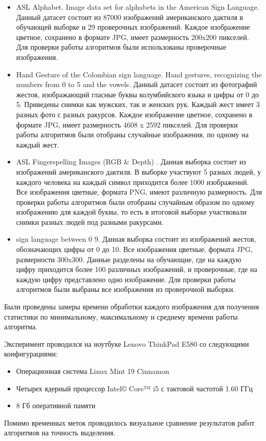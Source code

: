 \begin{itemize}
	\item ASL Alphabet. Image data set for alphabets in the American Sign Language\cite{AslAlphabet}. Данный датасет состоит из 87000 изображений американского дактиля в обучающей выборке и 29 проверочных изображений. Каждое изображение цветное, сохранено в формате JPG, имеет размерность 200x200 пикселей. Для проверки работы алгоритмов были использованы проверочные изображения.
	
	\item Hand Gesture of the Colombian sign language. Hand gestures, recognizing the numbers from 0 to 5 and the vowels\cite{Colombian}. Данный датасет состоит из фотографий жестов, изображающий гласные буквы колумбийского языка и цифры от 0 до 5. Приведены снимки как мужских, так и женских рук. Каждый жест имеет 3 разных фото с разных ракурсов. Каждое изображение цветное, сохранено в формате JPG, имеет размерность 4608 x 2592 пикселей. Для проверки работы алгоритмов были отобраны случайные изображения, по одному на каждый жест.
	
	\item ASL Fingerspelling Images (RGB \& Depth) \cite{asl2}. Данная выборка состоит из изображений американского дактиля. В выборке участвуют 5 разных людей, у каждого человека на каждый символ приходится более 1000 изображений. Все изображения цветные, формата PNG, имеют различную размерность. Для проверки работы алгоритмов были отобраны случайным образом по одному изображению для каждой буквы, то есть в итоговой выборке участвовали снимки разных людей под разными ракурсами.
	
	\item sign language between 0 9\cite{sl09}. Данная выборка состоит из изображений жестов, обозначающих цифры от 0 до 10. Все изображения цветные, формата JPG, размерности 300x300. Данные разделены на обучающие, где на каждую цифру приходится более 100 различных изображений, и проверочные, где на каждую цифру представлено одно изображение. Для проверки работы алгоритмов были выбраны все изображения из проверочной выборки. 
	
\end{itemize}

 Были проведены замеры времени обработки каждого изображения для получения статистики по минимальному, максимальному и среднему времени работы алгоритма.
 
 Эксперимент проводился на ноутбуке Lenovo ThinkPad E580 со следующими конфигурациями:
 
 \begin{itemize}
 	\item Операционная система Linux Mint 19 Cinnamon
 	\item Четырех ядерный процессор Intel© Core™ i5 с тактовой частотой 1.60 ГГц
 	\item 8 Гб оперативной памяти
 \end{itemize}

Помимо временных меток проводилось визуальное сравнение результатов работ алгоритмов на точность выделения.